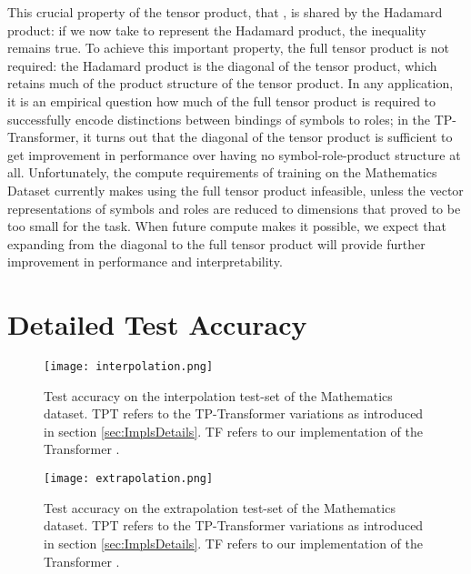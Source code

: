 \documentclass[11pt,a4paper]{article}
\begin{document}
This crucial property of the tensor product, that , is shared by the Hadamard product:  if we now take  to represent the Hadamard product, the inequality remains true. 
To achieve this important property, the full tensor product is not required: the Hadamard product is the diagonal of the tensor product, which retains much of the product structure of the tensor product. 
In any application, it is an empirical question how much of the full tensor product is required to successfully encode distinctions between bindings of symbols to roles; in the TP-Transformer, it turns out that the diagonal of the tensor product is sufficient to get improvement in performance over having no symbol-role-product structure at all. 
Unfortunately, the compute requirements of training on the Mathematics Dataset currently makes using the full tensor product infeasible, unless the vector representations of symbols and roles are reduced to dimensions that proved to be too small for the task. 
When future compute makes it possible, we expect that expanding from the diagonal to the full tensor product will provide further improvement in performance and interpretability.

\section{Detailed Test Accuracy}
\begin{figure*}[h]
  \vspace{-10pt}
  \centering
    \texttt{[image: interpolation.png]}
  \caption{Test accuracy on the interpolation test-set of the Mathematics dataset. TPT refers to the TP-Transformer variations as introduced in section \ref{sec:ImplsDetails}. TF refers to our implementation of the Transformer \cite{vaswani2017attention}.}
\end{figure*}

\begin{figure*}[t]
  \vspace{-10pt}
  \centering
    \texttt{[image: extrapolation.png]}
  \caption{Test accuracy on the extrapolation test-set of the Mathematics dataset. TPT refers to the TP-Transformer variations as introduced in section \ref{sec:ImplsDetails}. TF refers to our implementation of the Transformer \cite{vaswani2017attention}.}
\end{figure*}
\end{document}
